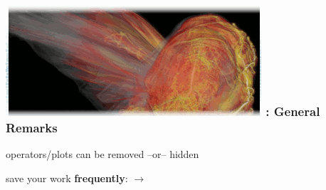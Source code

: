 \begin{frame}
\frametitle{\href{https://wci.llnl.gov/simulation/computer-codes/visit/}{\includegraphics[height=.85cm]{figs/visit-logos/VisIt-03}} \hspace{-.85cm}{\bf \textcolor{lightgray}{VisIt}}: General Remarks}

\begin{beamerboxesrounded}[upper=block head,lower=block body,shadow=true]{}
        \textcolor{DarkBlue}{} operators/plots can be removed
                \framebox{\textcolor{DarkBlue}{\bf Delete}}
                --or--
                hidden \framebox{\textcolor{DarkBlue}{\bf Hide/Show}}

        \textcolor{DarkBlue}{} save your work {\bf frequently}:
                 $\rightarrow$ \framebox{\textcolor{DarkBlue}{\bf Save session...}}
\end{beamerboxesrounded}

%
%
%
\end{frame}






